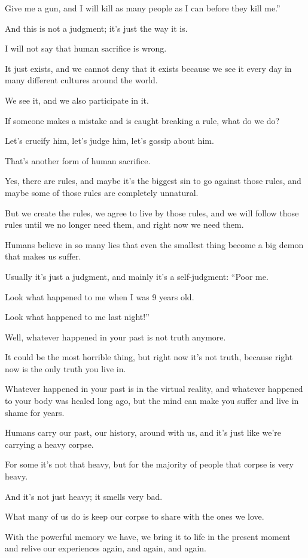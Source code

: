 \documentclass{article}
\numberwithin{equation}{section}
\begin{document}
Give me a gun, and I will kill as many people as I can before they kill me.''

And this is not a judgment; it's just the way it is.

I will not say that human sacrifice is wrong.

It just exists, and we cannot deny that it exists because we see it every day in many different cultures around the world.

We see it, and we also participate in it.

If someone makes a mistake and is caught breaking a rule, what do we do?

Let's crucify him, let's judge him, let's gossip about him.

That's another form of human sacrifice.

Yes, there are rules, and maybe it's the biggest sin to go against those rules, and maybe some of those rules are completely unnatural.

But we create the rules, we agree to live by those rules, and we will follow those rules until we no longer need them, and right now we need them.

%
Humans believe in so many lies that even the smallest thing become a big demon that makes us suffer.

Usually it's just a judgment, and mainly it's a self-judgment: ``Poor me.

Look what happened to me when I was 9 years old.

Look what happened to me last night!''

Well, whatever happened in your past is not truth anymore.

It could be the most horrible thing, but right now it's not truth, because right now is the only truth you live in.

Whatever happened in your past is in the virtual reality, and whatever happened to your body was healed long ago, but the mind can make you suffer and live in shame for years.

%
Humans carry our past, our history, around with us, and it's just like we're carrying a heavy corpse.

For some it's not that heavy, but for the majority of people that corpse is very heavy.

And it's not just heavy; it smells very bad.

What many of us do is keep our corpse to share with the ones we love.

With the powerful memory we have, we bring it to life in the present moment and relive our experiences again, and again, and again.
\end{document}
